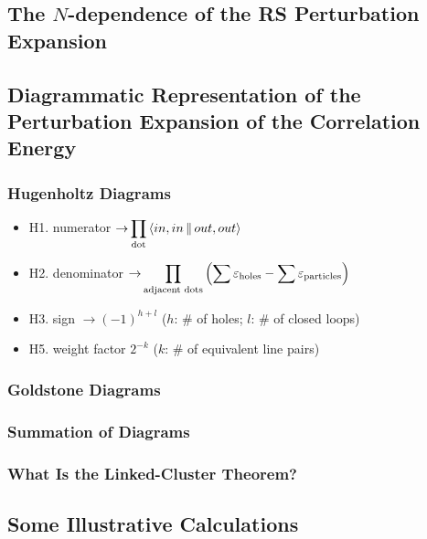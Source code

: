 \documentclass[a4paper]{article}
\DeclareMathOperator{\ra}{\rightarrow}
\newcommand{\dis}{\displaystyle}
\numberwithin{equation}{section}
\begin{document}
\subsection{The $ N $-dependence of the RS Perturbation Expansion}

\subsection{Diagrammatic Representation of the Perturbation Expansion of the Correlation Energy}
\subsubsection{Hugenholtz Diagrams}
\begin{itemize}
	\item H1. numerator  $\ra \dis\prod_{\text{dot}}\Braket{in,in || out,out} $
	\item H2. denominator $\ra \dis\prod_{\text{adjacent dots}}\qty(\sum \varepsilon_{\text{holes}} - \sum \varepsilon_{\text{particles}})  $
	\item H3. sign $ \ra (-1)^{h+l} $ ($ h $: \# of holes; $ l $: \# of closed loops)
	\item H5. weight factor $ 2^{-k} $ ($ k $: \# of equivalent line pairs)
\end{itemize}

\subsubsection{Goldstone Diagrams}

\subsubsection{Summation of Diagrams}

\subsubsection{What Is the Linked-Cluster Theorem?}

\subsection{Some Illustrative Calculations}
\end{document}
